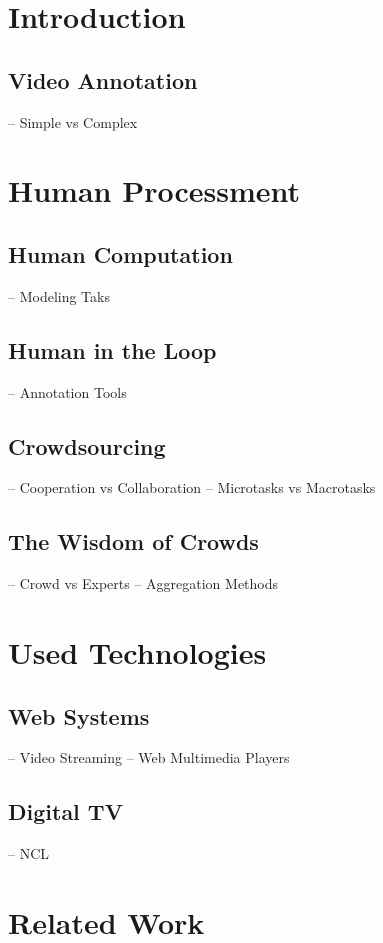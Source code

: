 \documentclass[sigconf]{acmart}
\begin{document}
\section{Introduction}
	
	
	\subsection{Video Annotation}
	-- Simple vs Complex


\section{Human Processment}

	\subsection{Human Computation}
	-- Modeling Taks

	\subsection{Human in the Loop}
	-- Annotation Tools

	\subsection{Crowdsourcing}
	-- Cooperation vs Collaboration
	-- Microtasks vs Macrotasks

	\subsection{The Wisdom of Crowds}
	-- Crowd vs Experts
	-- Aggregation Methods

\section{Used Technologies}

	\subsection{Web Systems}
	-- Video Streaming
	-- Web Multimedia Players

	\subsection{Digital TV}
	-- NCL

\section{Related Work}
	
\end{document}
